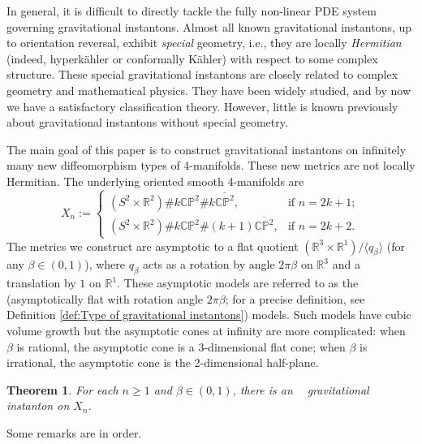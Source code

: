 \documentclass[a4paper,11pt]{amsart}
\newtheorem{theorem}{Theorem}[section]
\theoremstyle{definition}
\numberwithin{equation}{section}
\newcommand{\R}{\mathbb{R}}
\newcommand{\CP}{\mathbb{CP}}
\DeclareMathOperator{\AFa}{AF_\beta}
\begin{document}
 In general, it is difficult to directly tackle the fully non-linear PDE system governing gravitational instantons.  Almost all known gravitational instantons,  up to orientation reversal, exhibit \emph{special} geometry, i.e.,  they are locally \emph{Hermitian} (indeed, hyperk\"ahler or conformally K\"ahler) with respect to some complex structure. These special gravitational instantons are closely related to complex geometry and mathematical physics. They have been widely studied, and by now we have a satisfactory classification theory. However, little is known previously about gravitational instantons without special geometry.



The main goal of this paper is to construct gravitational instantons on infinitely many new diffeomorphism types of 4-manifolds. These new metrics are not locally Hermitian. The underlying oriented smooth 4-manifolds are 
\begin{equation}\label{eqn:definition of Xn}X_n:=\begin{cases}(S^2\times \R^2)\# k {\CP^2}\# k \overline{\CP^2},  & \text{if } n=2k+1;
\\ (S^2\times \R^2)\# k{\CP^2} \# (k+1)\overline{\CP^2}, & \text{if } n=2k+2.
\end{cases}
\end{equation}
 The metrics we construct are asymptotic to a flat quotient $(\R^3\times \R^1)/\langle q_\beta\rangle$ (for any $\beta \in (0, 1)$),  where $q_\beta$ acts as a rotation by angle $2\pi\beta$ on $\R^3$ and a translation by  $1$ on $\R^1$. These asymptotic models are referred to as the $\AFa$  (asymptotically flat with rotation angle $2\pi\beta$; for a precise definition, see Definition \ref{def:Type of gravitational instantons}) models. Such models have cubic volume growth but the asymptotic cones at infinity are  more complicated: when $\beta$ is rational, the asymptotic cone is a 3-dimensional flat cone; when $\beta$ is irrational, the asymptotic cone is the 2-dimensional half-plane.

\begin{theorem}\label{t:main}
	For each $n\geq 1$ and $\beta\in (0, 1)$, there is an $\AFa$ gravitational instanton on $X_n$.
\end{theorem}


 Some remarks are in order.

 \
\end{document}
